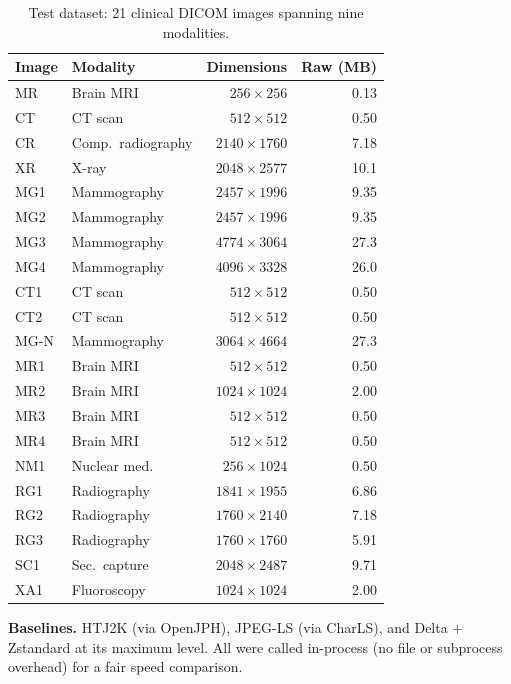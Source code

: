 \documentclass[11pt]{article}
\begin{document}
\begin{table}[htbp]
\centering
\caption{Test dataset: 21 clinical DICOM images spanning nine modalities.}
\label{tab:dataset}
\footnotesize
\begin{tabular}{llrr}
\toprule
Image & Modality & Dimensions & Raw (MB) \\
\midrule
MR   & Brain MRI      & $256{\times}256$   & 0.13 \\
CT   & CT scan        & $512{\times}512$   & 0.50 \\
CR   & Comp.\ radiography & $2140{\times}1760$ & 7.18 \\
XR   & X-ray          & $2048{\times}2577$ & 10.1 \\
MG1  & Mammography    & $2457{\times}1996$ & 9.35 \\
MG2  & Mammography    & $2457{\times}1996$ & 9.35 \\
MG3  & Mammography    & $4774{\times}3064$ & 27.3 \\
MG4  & Mammography    & $4096{\times}3328$ & 26.0 \\
CT1  & CT scan        & $512{\times}512$   & 0.50 \\
CT2  & CT scan        & $512{\times}512$   & 0.50 \\
MG-N & Mammography    & $3064{\times}4664$ & 27.3 \\
MR1  & Brain MRI      & $512{\times}512$   & 0.50 \\
MR2  & Brain MRI      & $1024{\times}1024$ & 2.00 \\
MR3  & Brain MRI      & $512{\times}512$   & 0.50 \\
MR4  & Brain MRI      & $512{\times}512$   & 0.50 \\
NM1  & Nuclear med.   & $256{\times}1024$  & 0.50 \\
RG1  & Radiography    & $1841{\times}1955$ & 6.86 \\
RG2  & Radiography    & $1760{\times}2140$ & 7.18 \\
RG3  & Radiography    & $1760{\times}1760$ & 5.91 \\
SC1  & Sec.~capture   & $2048{\times}2487$ & 9.71 \\
XA1  & Fluoroscopy    & $1024{\times}1024$ & 2.00 \\
\bottomrule
\end{tabular}
\end{table}

\textbf{Baselines.} HTJ2K (via OpenJPH), JPEG-LS (via CharLS), and Delta +
Zstandard at its maximum level. All were called in-process (no file or
subprocess overhead) for a fair speed comparison.
\end{document}
